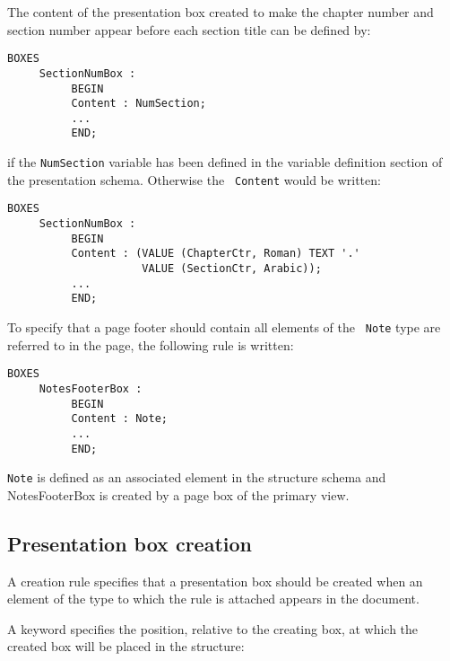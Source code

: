 \begin{example}
The content of the presentation box created to make the chapter
number and section number appear before each section title can be
defined by:

\begin{verbatim}
BOXES
     SectionNumBox :
          BEGIN
          Content : NumSection;
          ...
          END;
\end{verbatim}
if the {\tt NumSection} variable has been defined in the variable
definition section of the presentation schema.  Otherwise the {\tt
Content} would be written:

\begin{verbatim}
BOXES
     SectionNumBox :
          BEGIN
          Content : (VALUE (ChapterCtr, Roman) TEXT '.'
                     VALUE (SectionCtr, Arabic));
          ...
          END;
\end{verbatim}

To specify that a page footer should contain all elements of the {\tt
Note} type are referred to in the page, the following rule is written:
\begin{verbatim}
BOXES
     NotesFooterBox :
          BEGIN
          Content : Note;
          ...
          END;
\end{verbatim}
{\tt Note} is defined as an associated element in the structure schema
and NotesFooterBox is created by a page box of the primary view.
\end{example}

\subsection{Presentation box creation}
\label{creation}

A creation rule specifies that a presentation box should be created
when an element of the type to which the rule is attached appears in
the document.

A keyword specifies the position, relative to the
creating box, at which the created box will be placed in the
structure:

